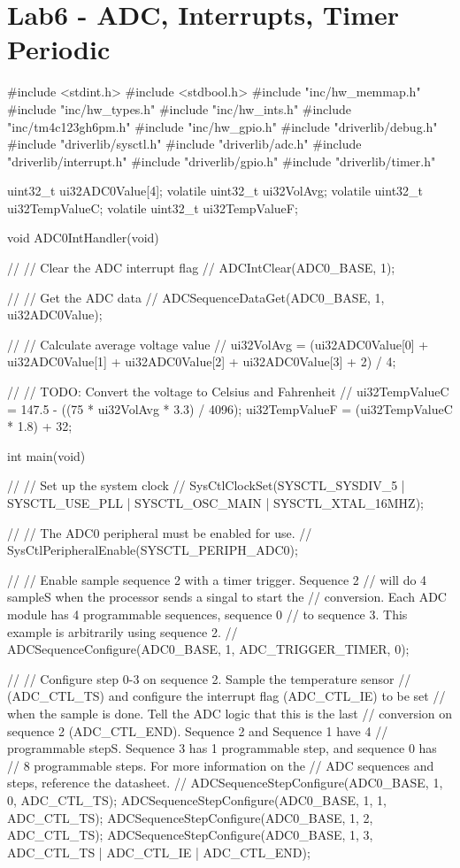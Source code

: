 \documentclass[12pt, a4paper]{article}
\begin{document}
\section{Lab6 - ADC, Interrupts, Timer Periodic}
\begin{code}
#include <stdint.h>
#include <stdbool.h>
#include "inc/hw_memmap.h"
#include "inc/hw_types.h"
#include "inc/hw_ints.h"
#include "inc/tm4c123gh6pm.h"
#include "inc/hw_gpio.h"
#include "driverlib/debug.h"
#include "driverlib/sysctl.h"
#include "driverlib/adc.h"
#include "driverlib/interrupt.h"
#include "driverlib/gpio.h"
#include "driverlib/timer.h"

uint32_t ui32ADC0Value[4];
volatile uint32_t ui32VolAvg;
volatile uint32_t ui32TempValueC;
volatile uint32_t ui32TempValueF;

void ADC0IntHandler(void) {
    //
    // Clear the ADC interrupt flag
    //
    ADCIntClear(ADC0_BASE, 1);
    
    //
    // Get the ADC data
    //
    ADCSequenceDataGet(ADC0_BASE, 1, ui32ADC0Value);
    
    //
    // Calculate average voltage value
    //
    ui32VolAvg = (ui32ADC0Value[0] + ui32ADC0Value[1] + ui32ADC0Value[2] + ui32ADC0Value[3] + 2) / 4;
    
    //
    // TODO: Convert the voltage to Celsius and Fahrenheit
    //
    ui32TempValueC = 147.5 - ((75 * ui32VolAvg * 3.3) / 4096);
    ui32TempValueF = (ui32TempValueC * 1.8) + 32;
}

int main(void) {
    //
    // Set up the system clock
    //
    SysCtlClockSet(SYSCTL_SYSDIV_5 | SYSCTL_USE_PLL | SYSCTL_OSC_MAIN | SYSCTL_XTAL_16MHZ);

    //
    // The ADC0 peripheral must be enabled for use.
    //
    SysCtlPeripheralEnable(SYSCTL_PERIPH_ADC0);
    
    //
    // Enable sample sequence 2 with a timer trigger. Sequence 2
    // will do 4 sampleS when the processor sends a singal to start the
    // conversion. Each ADC module has 4 programmable sequences, sequence 0
    // to sequence 3. This example is arbitrarily using sequence 2.
    //
    ADCSequenceConfigure(ADC0_BASE, 1, ADC_TRIGGER_TIMER, 0);

    //
    // Configure step 0-3 on sequence 2. Sample the temperature sensor
    // (ADC_CTL_TS) and configure the interrupt flag (ADC_CTL_IE) to be set
    // when the sample is done. Tell the ADC logic that this is the last
    // conversion on sequence 2 (ADC_CTL_END).  Sequence 2 and Sequence 1 have 4
    // programmable stepS. Sequence 3 has 1 programmable step, and sequence 0 has
    // 8 programmable steps. For more information on the
    // ADC sequences and steps, reference the datasheet.
    //
    ADCSequenceStepConfigure(ADC0_BASE, 1, 0, ADC_CTL_TS);
    ADCSequenceStepConfigure(ADC0_BASE, 1, 1, ADC_CTL_TS);
    ADCSequenceStepConfigure(ADC0_BASE, 1, 2, ADC_CTL_TS);
    ADCSequenceStepConfigure(ADC0_BASE, 1, 3, ADC_CTL_TS | ADC_CTL_IE | ADC_CTL_END);

}
\end{code}
\end{document}
